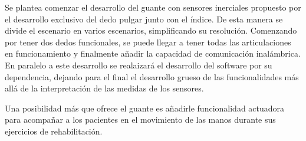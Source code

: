 Se plantea comenzar el desarrollo del guante con sensores inerciales propuesto por el desarrollo exclusivo del dedo pulgar junto con el índice. De esta manera se divide el escenario en varios escenarios, simplificando su resolución. Comenzando por tener dos dedos funcionales, se puede llegar a tener todas las articulaciones en funcionamiento y finalmente añadir la capacidad de comunicación inalámbrica. En paralelo a este desarrollo se realaizará el desarrollo del software por su dependencia, dejando para el final el desarrollo grueso de las funcionalidades más allá de la interpretación de las medidas de los sensores.

Una posibilidad más que ofrece el guante es añadirle funcionalidad actuadora para acompañar a los pacientes en el movimiento de las manos durante sus ejercicios de rehabilitación. 






 
